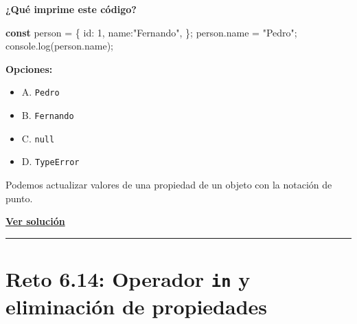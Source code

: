 \documentclass[
  letterpaper,
  DIV=11,
  numbers=noendperiod]{scrreprt}
\newenvironment{Shaded}{\begin{snugshade}}{\end{snugshade}}
\newcommand{\AttributeTok}[1]{\textcolor[rgb]{0.40,0.45,0.13}{#1}}
\newcommand{\BuiltInTok}[1]{\textcolor[rgb]{0.00,0.23,0.31}{#1}}
\newcommand{\DataTypeTok}[1]{\textcolor[rgb]{0.68,0.00,0.00}{#1}}
\newcommand{\DecValTok}[1]{\textcolor[rgb]{0.68,0.00,0.00}{#1}}
\newcommand{\FunctionTok}[1]{\textcolor[rgb]{0.28,0.35,0.67}{#1}}
\newcommand{\KeywordTok}[1]{\textcolor[rgb]{0.00,0.23,0.31}{\textbf{#1}}}
\newcommand{\NormalTok}[1]{\textcolor[rgb]{0.00,0.23,0.31}{#1}}
\newcommand{\OperatorTok}[1]{\textcolor[rgb]{0.37,0.37,0.37}{#1}}
\newcommand{\StringTok}[1]{\textcolor[rgb]{0.13,0.47,0.30}{#1}}
\providecommand{\tightlist}{%
  \setlength{\itemsep}{0pt}\setlength{\parskip}{0pt}}
\begin{document}
\textbf{¿Qué imprime este código?}

\begin{Shaded}
\begin{Highlighting}[]
\KeywordTok{const}\NormalTok{ person }\OperatorTok{=}\NormalTok{ \{}
  \DataTypeTok{id}\OperatorTok{:} \DecValTok{1}\OperatorTok{,}
  \DataTypeTok{name}\OperatorTok{:}\StringTok{"Fernando"}\OperatorTok{,}
\NormalTok{\}}\OperatorTok{;}
\NormalTok{person}\OperatorTok{.}\AttributeTok{name} \OperatorTok{=} \StringTok{"Pedro"}\OperatorTok{;}
\BuiltInTok{console}\OperatorTok{.}\FunctionTok{log}\NormalTok{(person}\OperatorTok{.}\AttributeTok{name}\NormalTok{)}\OperatorTok{;}
\end{Highlighting}
\end{Shaded}

\textbf{Opciones:}

\begin{itemize}
\tightlist
\item
  A. \texttt{Pedro}
\item
  B. \texttt{Fernando}
\item
  C. \texttt{null}
\item
  D. \texttt{TypeError}
\end{itemize}

\begin{tcolorbox}[enhanced jigsaw, left=2mm, toprule=.15mm, leftrule=.75mm, breakable, colback=white, coltitle=black, bottomtitle=1mm, arc=.35mm, rightrule=.15mm, colframe=quarto-callout-tip-color-frame, opacitybacktitle=0.6, toptitle=1mm, opacityback=0, titlerule=0mm, title=\textcolor{quarto-callout-tip-color}{\faLightbulb}\hspace{0.5em}{Pista}, bottomrule=.15mm, colbacktitle=quarto-callout-tip-color!10!white]

Podemos actualizar valores de una propiedad de un objeto con la notación
de punto.

\end{tcolorbox}

\textbf{\hyperref[sec-sol-cap6-reto13]{Ver solución}}

\begin{center}\rule{0.5\linewidth}{0.5pt}\end{center}

\section{\texorpdfstring{Reto 6.14: Operador \texttt{in} y eliminación
de
propiedades}{Reto 6.14: Operador in y eliminación de propiedades}}\label{sec-cap6-reto14}
\end{document}
